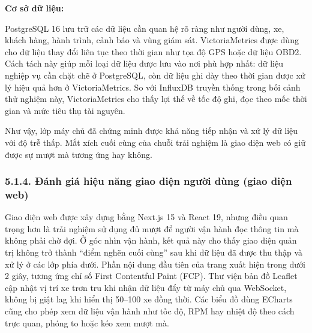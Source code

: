 \documentclass[a4paper]{extarticle}
\begin{document}
\textbf{Cơ sở dữ liệu:}

PostgreSQL 16 lưu trữ các dữ liệu cần quan hệ rõ ràng như người dùng,
xe, khách hàng, hành trình, cảnh báo và vùng giám sát. VictoriaMetrics
được dùng cho dữ liệu thay đổi liên tục theo thời gian như tọa độ GPS
hoặc dữ liệu OBD2. Cách tách này giúp mỗi loại dữ liệu được lưu vào nơi
phù hợp nhất: dữ liệu nghiệp vụ cần chặt chẽ ở PostgreSQL, còn dữ liệu
ghi dày theo thời gian được xử lý hiệu quả hơn ở VictoriaMetrics. So với
InfluxDB truyền thống trong bối cảnh thử nghiệm này, VictoriaMetrics cho
thấy lợi thế về tốc độ ghi, đọc theo mốc thời gian và mức tiêu thụ tài
nguyên.

Như vậy, lớp máy chủ đã chứng minh được khả năng tiếp nhận và xử lý dữ
liệu với độ trễ thấp. Mắt xích cuối cùng của chuỗi trải nghiệm là giao
diện web có giữ được sự mượt mà tương ứng hay không.

\subsubsection{5.1.4. Đánh giá hiệu năng giao diện người dùng
(giao diện web)}\label{514-ux111uxe1nh-giuxe1-hiux1ec7u-nux103ng-giao-diux1ec7n-ngux1b0ux1eddi-duxf9ng-frontend}

Giao diện web được xây dựng bằng Next.js 15 và React 19, nhưng điều quan
trọng hơn là trải nghiệm sử dụng đủ mượt để người vận hành đọc thông tin
mà không phải chờ đợi. Ở góc nhìn vận hành, kết quả này cho thấy
giao diện quản trị không trở thành ``điểm nghẽn cuối cùng'' sau khi dữ liệu đã
được thu thập và xử lý ở các lớp phía dưới. Phần nội dung đầu tiên của
trang xuất hiện trong dưới 2 giây, tương ứng chỉ số First Contentful
Paint (FCP). Thư viện bản đồ Leaflet cập
nhật vị trí xe trơn tru khi nhận dữ liệu đẩy từ máy chủ qua WebSocket,
không bị giật lag khi hiển thị 50--100 xe đồng thời. Các biểu đồ dùng
ECharts cũng cho phép xem dữ liệu vận hành như tốc độ, RPM hay nhiệt độ
theo cách trực quan, phóng to hoặc kéo xem mượt mà.
\end{document}
